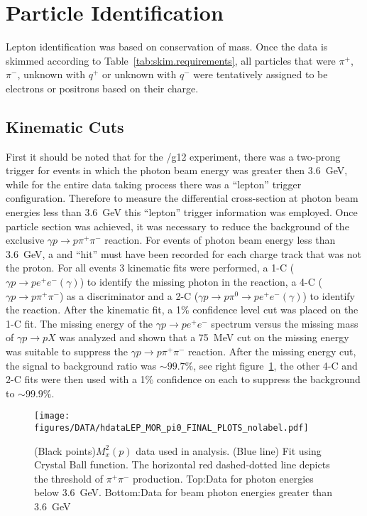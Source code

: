 \section{Particle Identification}\label{sec:analysis.pid}
	Lepton identification was based on conservation of mass. Once the data is skimmed according to Table~\ref{tab:skim.requirements}, all particles that were $\pi^+$, $\pi^-$, 
	unknown with $q^+$ or unknown with $q^-$ were tentatively assigned to be electrons or positrons based on their charge. 
	\subsection{Kinematic Cuts}\label{sec:analysis.cuts}
		First it should be noted that for the /g12 experiment, there was a two-prong trigger for events in which the photon beam energy was greater then 3.6~GeV, while for the 
		entire data taking process there was a ``lepton'' trigger configuration. Therefore to measure the differential cross-section at photon beam energies less than 3.6~GeV this 
		``lepton'' trigger information was employed. 
		Once particle section was achieved, it was necessary to reduce the background of the exclusive $\gamma p \to p \pi^{+}\pi^{-}$ reaction. For events of photon beam 
		energy less than 3.6~GeV, a  and  ``hit'' must have been recorded for each charge track that was not the proton. For all events 3 kinematic fits were 
		performed, a 1-C ( $\gamma p \to p e^{+}e^{-}(\gamma)$) to identify the missing photon in the reaction, a 4-C ($\gamma p \to p \pi^{+}\pi^{-}$) as a discriminator and a 
		2-C ($\gamma p \to p \pi^0 \to pe^{+}e^{-}(\gamma)$) to identify the reaction. After the kinematic fit, a 1\% confidence level cut was placed on the 1-C fit. The missing 
		energy of the $\gamma p \to p e^{+}e^{-}$ spectrum versus the missing mass of $\gamma p \to p X$ was analyzed and shown that a 75~MeV cut on the missing energy 
		was suitable to suppress the $\gamma p \to p \pi^{+}\pi^{-}$ reaction. After the missing energy cut, the signal to background ratio was $\sim 99.7\%$, see right 
		figure~\ref{fig:Mxp}, the other 4-C and 2-C fits were then used with a 1\% confidence on each to suppress the background to $\sim 99.9\%$.
		\begin{figure}[h!]\begin{center}
				\texttt{[image: \\figures/DATA/hdataLEP\_MOR\_pi0\_FINAL\_PLOTS\_nolabel.pdf]}		
				\caption{(Black points)$M_x^2(p)$ data used in analysis. (Blue line) Fit using Crystal Ball function. The horizontal red dashed-dotted line depicts the threshold of $\pi^{+}\pi^{-}$ production. Top:Data for photon energies below 3.6~GeV. Bottom:Data for beam photon energies greater than 3.6~GeV}{}
				\label{fig:Mxp}
		\end{center}\end{figure}